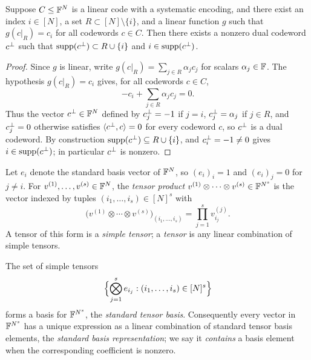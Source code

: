 \begin{lemma}
  \label{lem:dual-witness}
  Suppose $C \le \mathbb{F}^N$ is a linear code with a systematic encoding, and there
  exist an index $i \in [N]$, a set $R \subset [N] \setminus \{i\}$, and a
  linear function $g$ such that $g(c|_R) = c_i$ for all codewords $c \in C$.
  Then there exists a nonzero dual codeword $c^{\perp}$ such that
  $\operatorname{supp}(c^{\perp}) \subset R \cup \{i\}$ and $i \in \operatorname{supp}(c^{\perp})$.
\end{lemma}
\begin{proof}
  Since $g$ is linear, write $g(c|_R) = \sum_{j \in R} \alpha_j c_j$ for scalars
  $\alpha_j \in \mathbb{F}$. The hypothesis $g(c|_R) = c_i$ gives, for all codewords
  $c \in C$,
  \[
    -c_i + \sum_{j \in R} \alpha_j c_j = 0 .
  \]
  Thus the vector $c^{\perp} \in \mathbb{F}^N$ defined by $c^{\perp}_j = -1$ if $j = i$,
  $c^{\perp}_j = \alpha_j$ if $j \in R$, and $c^{\perp}_j = 0$ otherwise satisfies
  $\langle c^{\perp}, c\rangle = 0$ for every codeword $c$, so $c^{\perp}$ is a dual
  codeword. By construction $\operatorname{supp}(c^{\perp}) \subseteq R \cup \{i\}$, and
  $c^{\perp}_i = -1 \neq 0$ gives $i \in \operatorname{supp}(c^{\perp})$; in particular $c^{\perp}$ is
  nonzero.
\end{proof}


\begin{definition}
  \label{def:tensor}
  \mathlibok
  Let $e_i$ denote the standard basis vector of $\mathbb{F}^N$, so $(e_i)_i = 1$ and
  $(e_i)_j = 0$ for $j \neq i$. For $v^{(1)}, \dots, v^{(s)} \in \mathbb{F}^N$, the
  \emph{tensor product} $v^{(1)} \otimes \cdots \otimes v^{(s)} \in \mathbb{F}^{N^s}$ is
  the vector indexed by tuples $(i_1, \dots, i_s) \in [N]^s$ with
  \[
    \bigl(v^{(1)} \otimes \cdots \otimes v^{(s)}\bigr)_{(i_1, \dots, i_s)}
      = \prod_{j=1}^{s} v^{(j)}_{i_j} .
  \]
  A tensor of this form is a \emph{simple tensor}; a \emph{tensor} is any linear
  combination of simple tensors.
\end{definition}

\begin{lemma}
  \label{lem:std-tensor-basis}
  \mathlibok
  The set of simple tensors
  \[
    \Bigl\{ \bigotimes_{j=1}^{s} e_{i_j} : (i_1, \dots, i_s) \in [N]^s \Bigr\}
  \]
  forms a basis for $\mathbb{F}^{N^s}$, the \emph{standard tensor basis}. Consequently
  every vector in $\mathbb{F}^{N^s}$ has a unique expression as a linear combination of
  standard tensor basis elements, the \emph{standard basis representation}; we
  say it \emph{contains} a basis element when the corresponding coefficient is
  nonzero.
\end{lemma}

